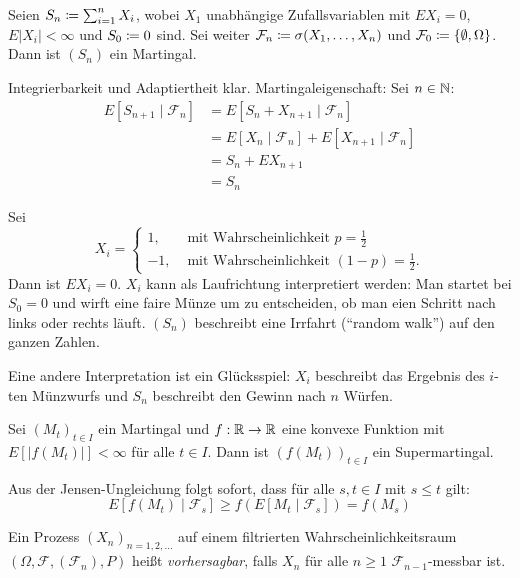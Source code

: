 \documentclass[a4paper,twoside,DIV15,BCOR12mm]{scrbook}
\newcommand{\cF}{\mathcal F}
\begin{document}
\begin{beispiel}
Seien $S_n \da \sum_{i=1}^n X_i$, wobei $X_1$ unabhängige Zufallsvariablen mit $EX_i=0$, $E|X_i|<\infty$ und $S_0\da 0$ sind. Sei weiter $\cF_n\da \sigma(X_1,\ldots,X_n)$ und $\cF_0 \da \{\emptyset, \Omega\}$. Dann ist $(S_n)$ ein Martingal.
\end{beispiel}
\begin{beweis}
Integrierbarkeit und Adaptiertheit klar. Martingaleigenschaft: Sei $n\in\mathbb{N}$:
\begin{align*}
E[S_{n+1}\mid \cF_n] &= E[S_n + X_{n+1}\mid \cF_n] \\
&= E[X_n\mid \cF_n] + E[X_{n+1}\mid \cF_n] \\
&= S_n + EX_{n+1} \\
&= S_n
\end{align*}
\end{beweis}

Sei 
\[
X_i = 
\begin{cases}
1, & \text{ mit Wahrscheinlichkeit $p=\frac 12$} \\
-1,& \text{ mit Wahrscheinlichkeit $(1-p)=\frac 12$.}
\end{cases}
\]
Dann ist $EX_i = 0$. $X_i$ kann als Laufrichtung interpretiert werden: Man startet bei $S_0=0$ und wirft eine faire Münze um zu entscheiden, ob man eien Schritt nach links oder rechts läuft. $(S_n)$ beschreibt eine Irrfahrt (“random walk”) auf den ganzen Zahlen.

Eine andere Interpretation ist ein Glücksspiel: $X_i$ beschreibt das Ergebnis des $i$-ten Münzwurfs und $S_n$ beschreibt den Gewinn nach $n$ Würfen.

\begin{satz}
Sei $(M_t)_{t\in I}$ ein Martingal und $f:\mathbb{R} \to\mathbb{R}$ eine konvexe Funktion mit $E[|f(M_t)|]<\infty$ für alle $t\in I$. Dann ist $(f(M_t))_{t\in I}$ ein Supermartingal.
\end{satz}

\begin{beweis}
Aus der Jensen-Ungleichung folgt sofort, dass für alle $s,t\in I$ mit $s\le t$ gilt:
\[
E[f(M_t)\mid \cF_s] \ge f(E[M_t\mid \cF_s]) = f(M_s)
\]
\end{beweis}

\begin{definition}
Ein Prozess $(X_n)_{n=1,2,\ldots}$ auf einem filtrierten Wahrscheinlichkeitsraum $(\Omega, \cF, (\cF_n), P)$ heißt \emph{vorhersagbar},  falls $X_n$ für alle $n\ge 1$ $\cF_{n-1}$-messbar ist.
\end{definition}
\end{document}
